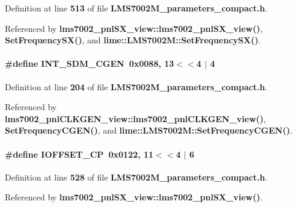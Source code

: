 Definition at line {\bf 513} of file {\bf L\+M\+S7002\+M\+\_\+parameters\+\_\+compact.\+h}.



Referenced by {\bf lms7002\+\_\+pnl\+S\+X\+\_\+view\+::lms7002\+\_\+pnl\+S\+X\+\_\+view()}, {\bf Set\+Frequency\+S\+X()}, and {\bf lime\+::\+L\+M\+S7002\+M\+::\+Set\+Frequency\+S\+X()}.

\paragraph[{I\+N\+T\+\_\+\+S\+D\+M\+\_\+\+C\+G\+EN}]{\setlength{\rightskip}{0pt plus 5cm}\#define I\+N\+T\+\_\+\+S\+D\+M\+\_\+\+C\+G\+EN~0x0088, 13$<$$<$4 $\vert$  4}\label{LMS7002M__parameters__compact_8h_a87a79582ce95dcb523fcc694acc2c9c0}


Definition at line {\bf 204} of file {\bf L\+M\+S7002\+M\+\_\+parameters\+\_\+compact.\+h}.



Referenced by {\bf lms7002\+\_\+pnl\+C\+L\+K\+G\+E\+N\+\_\+view\+::lms7002\+\_\+pnl\+C\+L\+K\+G\+E\+N\+\_\+view()}, {\bf Set\+Frequency\+C\+G\+E\+N()}, and {\bf lime\+::\+L\+M\+S7002\+M\+::\+Set\+Frequency\+C\+G\+E\+N()}.

\paragraph[{I\+O\+F\+F\+S\+E\+T\+\_\+\+CP}]{\setlength{\rightskip}{0pt plus 5cm}\#define I\+O\+F\+F\+S\+E\+T\+\_\+\+CP~0x0122, 11$<$$<$4 $\vert$  6}\label{LMS7002M__parameters__compact_8h_ab11bc90e233b583cc4cef361134fa6f6}


Definition at line {\bf 528} of file {\bf L\+M\+S7002\+M\+\_\+parameters\+\_\+compact.\+h}.



Referenced by {\bf lms7002\+\_\+pnl\+S\+X\+\_\+view\+::lms7002\+\_\+pnl\+S\+X\+\_\+view()}.

